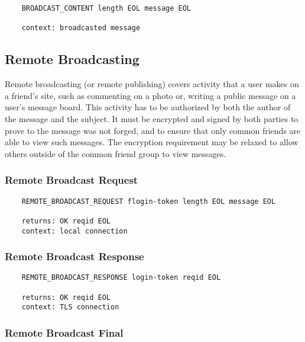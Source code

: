 \documentclass[letterpaper,11pt,oneside]{article}
\begin{document}
\vspace{10pt}
\begin{verbatim}
    BROADCAST_CONTENT length EOL message EOL

    context: broadcasted message
\end{verbatim}

\subsection{Remote Broadcasting}

Remote broadcasting (or remote publishing) covers activity that a user makes on
a friend's site, such as commenting on a photo or, writing a public message on
a user's message board. This activity has to be authorized by both the author
of the message and the subject. It must be encrypted and signed by both parties
to prove to the message was not forged, and to ensure that only common friends
are able to view such messages. The encryption requirement may be relaxed to
allow others outside of the common friend group to view messages.

\subsubsection{Remote Broadcast Request}

\vspace{10pt}
\begin{verbatim}
    REMOTE_BROADCAST_REQUEST flogin-token length EOL message EOL

    returns: OK reqid EOL
    context: local connection
\end{verbatim}
\vspace{10pt}

\subsubsection{Remote Broadcast Response}

\vspace{10pt}
\begin{verbatim}
    REMOTE_BROADCAST_RESPONSE login-token reqid EOL 

    returns: OK reqid EOL
    context: TLS connection
\end{verbatim}
\vspace{10pt}

\subsubsection{Remote Broadcast Final}
\end{document}
